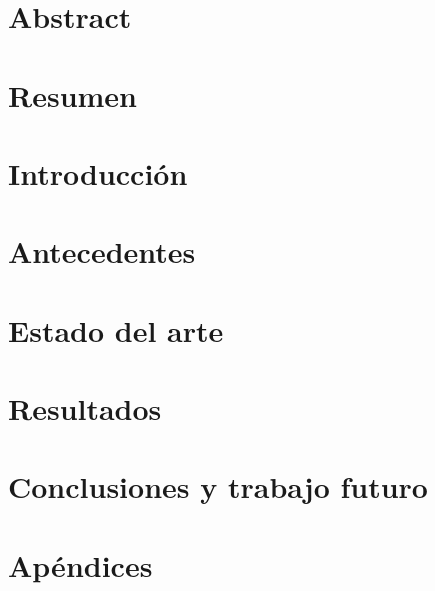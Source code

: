 \documentclass[12pt]{book}
\theoremstyle{definition}
\begin{document}





\chapter*{Abstract}

\chapter*{Resumen}


\tableofcontents

\listoffigures

\listoftables

\chapter{Introducción}

\chapter{Antecedentes}

\chapter{Estado del arte}
\label{cap3}
\chapter{Resultados}\label{cap4}

\chapter{Conclusiones y trabajo futuro}


\chapter*{Apéndices}



\end{document}
